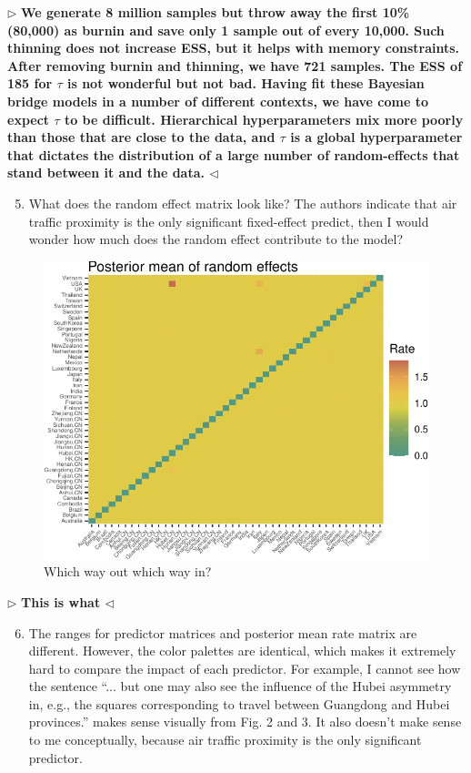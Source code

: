 \documentclass[12pt]{article}
\newenvironment{reply}{$\triangleright$\bfseries}{$\triangleleft$}
\begin{document}
\begin{reply}
We generate 8 million samples but throw away the first 10\% (80,000) as burnin and save only 1 sample out of every 10,000.  Such thinning does not increase ESS, but it helps with memory constraints.  After removing burnin and thinning, we have 721 samples.   The ESS of 185 for $\tau$ is not wonderful but not bad.  Having fit these Bayesian bridge models in a number of different contexts, we have come to expect $\tau$ to be difficult.   Hierarchical hyperparameters mix more poorly than those that are close to the data, and $\tau$ is a global hyperparameter that dictates the distribution of a large number of random-effects that stand between it and the data.
\end{reply}

\begin{enumerate}	
\setcounter{enumi}{4}	
	\item What does the random effect matrix look like? The authors indicate that air traffic proximity is the only significant fixed-effect predict, then I would wonder how much does the random effect contribute to the model?
\end{enumerate}

\begin{figure}[t]
	\centering
	\includegraphics[width=0.7\linewidth]{figures/randEffects.pdf}
	\caption{Which way out which way in?}
\end{figure}

\begin{reply}
This is what 
\end{reply}

\begin{enumerate}	
\setcounter{enumi}{5}	
	\item The ranges for predictor matrices and posterior mean rate matrix are different. However, the color palettes are identical, which makes it extremely hard to compare the impact of each predictor. For example, I cannot see how the sentence “... but one may also see the influence of the Hubei asymmetry in, e.g., the squares corresponding to travel between Guangdong and Hubei provinces.” makes sense visually from Fig. 2 and 3. It also doesn’t make sense to me conceptually, because air traffic proximity is the only significant predictor.
\end{enumerate}
\end{document}
